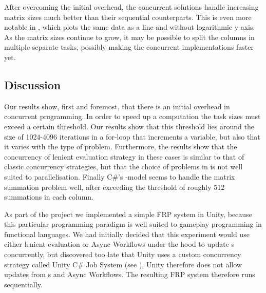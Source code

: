 After overcoming the initial overhead, the concurrent solutions handle increasing matrix sizes much better than their sequential counterparts. This is even more notable in , which plots the same data as a line and without logarithmic y-axis. As the matrix sizes continue to grow, it may be possible to split the columns in multiple separate tasks, possibly making the concurrent implementations faster yet.


\subsection{Discussion}
Our results show, first and foremost, that there is an initial overhead in concurrent programming. In order to speed up a computation the task sizes must exceed a certain threshold. Our results show that this threshold lies around the size of 1024-4096 iterations in a for-loop that increments a variable, but also that it varies with the type of problem. Furthermore, the results show that the concurrency of lenient evaluation strategy in these cases is similar to that of classic concurrency strategies, but that the choice of problems in \cite{DBLP:journals/cl/Tremblay-parallel} is not well suited to parallelisation. Finally C\#'s -model seems to handle the matrix summation problem well, after exceeding the threshold of roughly 512 summations in each column.

As part of the project we implemented a simple \gls{FRP} system in Unity, because this particular programming paradigm is well suited to gameplay programming in functional languages\needcite. We had initially decided that this experiment would use either lenient evaluation or Async Workflows under the hood to update s concurrently, but discovered too late that Unity uses a custom concurrency strategy called Unity C\# Job System\cite{unity:csharp:job:system} (see ). Unity therefore does not allow  updates from s and Async Workflows\cite{unity:async}. The resulting \gls{FRP} system therefore runs sequentially.